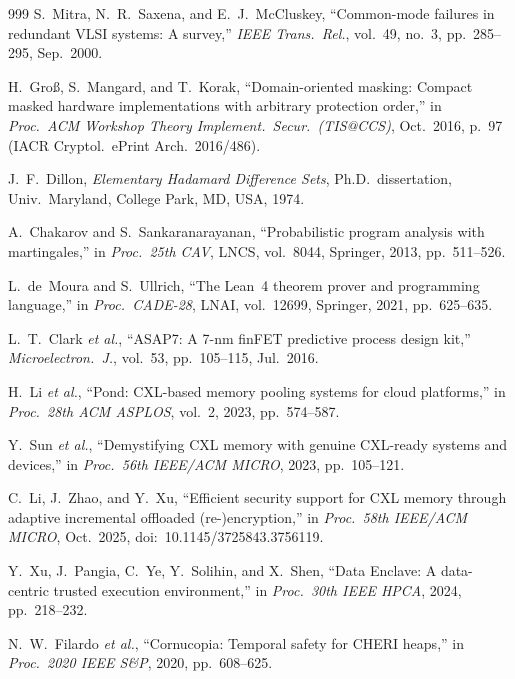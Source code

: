 \documentclass[11pt,letterpaper]{article}
\theoremstyle{spectralthm}
\begin{document}
\begin{thebibliography}{999}
S.~Mitra, N.~R.~Saxena, and E.~J.~McCluskey, ``Common-mode failures in redundant VLSI systems: A survey,'' \textit{IEEE Trans.\ Rel.}, vol.~49, no.~3, pp.~285--295, Sep.\ 2000.

H.~Gro{\ss}, S.~Mangard, and T.~Korak, ``Domain-oriented masking: Compact masked hardware implementations with arbitrary protection order,'' in \emph{Proc.\ ACM Workshop Theory Implement.\ Secur.\ (TIS@CCS)}, Oct.\ 2016, p.~97 (IACR Cryptol.\ ePrint Arch.\ 2016/486).

J.~F.~Dillon, \textit{Elementary Hadamard Difference Sets}, Ph.D.\ dissertation, Univ.\ Maryland, College Park, MD, USA, 1974.

A.~Chakarov and S.~Sankaranarayanan, ``Probabilistic program analysis with martingales,'' in \textit{Proc.\ 25th CAV}, LNCS, vol.~8044, Springer, 2013, pp.~511--526.

L.~de~Moura and S.~Ullrich, ``The Lean~4 theorem prover and programming language,'' in \textit{Proc.\ CADE-28}, LNAI, vol.~12699, Springer, 2021, pp.~625--635.

L.~T.~Clark \textit{et al.}, ``ASAP7: A 7-nm finFET predictive process design kit,'' \textit{Microelectron.\ J.}, vol.~53, pp.~105--115, Jul.\ 2016.

H.~Li \textit{et al.}, ``Pond: CXL-based memory pooling systems for cloud platforms,'' in \textit{Proc.\ 28th ACM ASPLOS}, vol.~2, 2023, pp.~574--587.

Y.~Sun \textit{et al.}, ``Demystifying CXL memory with genuine CXL-ready systems and devices,'' in \textit{Proc.\ 56th IEEE/ACM MICRO}, 2023, pp.~105--121.

C.~Li, J.~Zhao, and Y.~Xu, ``Efficient security support for CXL memory through adaptive incremental offloaded (re-)encryption,'' in \textit{Proc.\ 58th IEEE/ACM MICRO}, Oct.\ 2025, doi:~10.1145/3725843.3756119.

Y.~Xu, J.~Pangia, C.~Ye, Y.~Solihin, and X.~Shen, ``Data Enclave: A data-centric trusted execution environment,'' in \textit{Proc.\ 30th IEEE HPCA}, 2024, pp.~218--232.

N.~W.~Filardo \textit{et al.}, ``Cornucopia: Temporal safety for CHERI heaps,'' in \textit{Proc.\ 2020 IEEE S\&P}, 2020, pp.~608--625.


\end{thebibliography}
\end{document}
